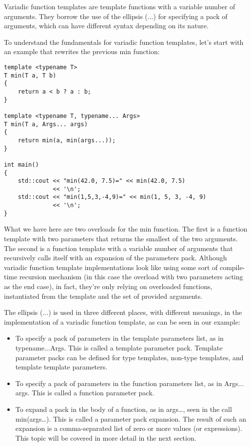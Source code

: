 Variadic function templates are template functions with a variable number of arguments. They borrow the use of the ellipsis (...) for specifying a pack of arguments, which can have different syntax depending on its nature.

To understand the fundamentals for variadic function templates, let's start with an example that rewrites the previous min function:

\begin{lstlisting}[style=styleCXX]
template <typename T>
T min(T a, T b)
{
	return a < b ? a : b;
}

template <typename T, typename... Args>
T min(T a, Args... args)
{
	return min(a, min(args...));
}

int main()
{
	std::cout << "min(42.0, 7.5)=" << min(42.0, 7.5)
	          << '\n';
	std::cout << "min(1,5,3,-4,9)=" << min(1, 5, 3, -4, 9)
	          << '\n';
}
\end{lstlisting}

What we have here are two overloads for the min function. The first is a function template with two parameters that returns the smallest of the two arguments. The second is a function template with a variable number of arguments that recursively calls itself with an expansion of the parameters pack. Although variadic function template implementations look like using some sort of compile-time recursion mechanism (in this case the overload with two parameters acting as the end case), in fact, they're only relying on overloaded functions, instantiated from the template and the set of provided arguments.

The ellipsis (...) is used in three different places, with different meanings, in the implementation of a variadic function template, as can be seen in our example:

\begin{itemize}
\item
To specify a pack of parameters in the template parameters list, as in typename...Args. This is called a template parameter pack. Template parameter packs can be defined for type templates, non-type templates, and template template parameters.

\item
To specify a pack of parameters in the function parameters list, as in Args...
args. This is called a function parameter pack.

\item
To expand a pack in the body of a function, as in args…, seen in the call min(args…). This is called a parameter pack expansion. The result of such an expansion is a comma-separated list of zero or more values (or expressions). This topic will be covered in more detail in the next section.
\end{itemize}

